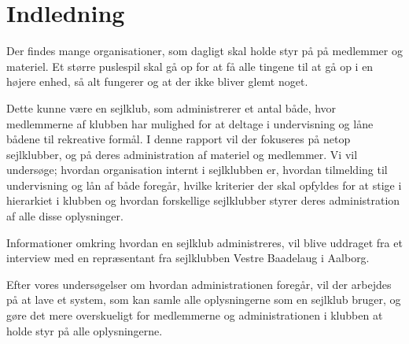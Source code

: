 \chapter{Indledning}\label{chap:indledning}



Der findes mange organisationer, som dagligt skal holde styr på på medlemmer og materiel. Et større
puslespil skal gå op for at få alle tingene til at gå op i en højere enhed, så alt fungerer og at der ikke
bliver glemt noget.

Dette kunne være en sejlklub, som administrerer et antal både, hvor medlemmerne af klubben har mulighed for at
deltage i undervisning og låne bådene til rekreative formål. I denne rapport vil der fokuseres på netop
sejlklubber, og på deres administration af materiel og medlemmer. Vi vil undersøge; hvordan organisation
internt i sejlklubben er, hvordan tilmelding til undervisning og lån af både foregår, hvilke kriterier der
skal opfyldes for at stige i hierarkiet i klubben og hvordan forskellige sejlklubber styrer deres
administration af alle disse oplysninger.

Informationer omkring hvordan en sejlklub administreres, vil blive uddraget fra et interview med en
repræsentant fra sejlklubben Vestre Baadelaug i Aalborg.

Efter vores undersøgelser om hvordan administrationen foregår, vil der arbejdes på at lave et system, som kan
samle alle oplysningerne som en sejlklub bruger, og gøre det mere overskueligt for medlemmerne og
administrationen i klubben at holde styr på alle oplysningerne.


